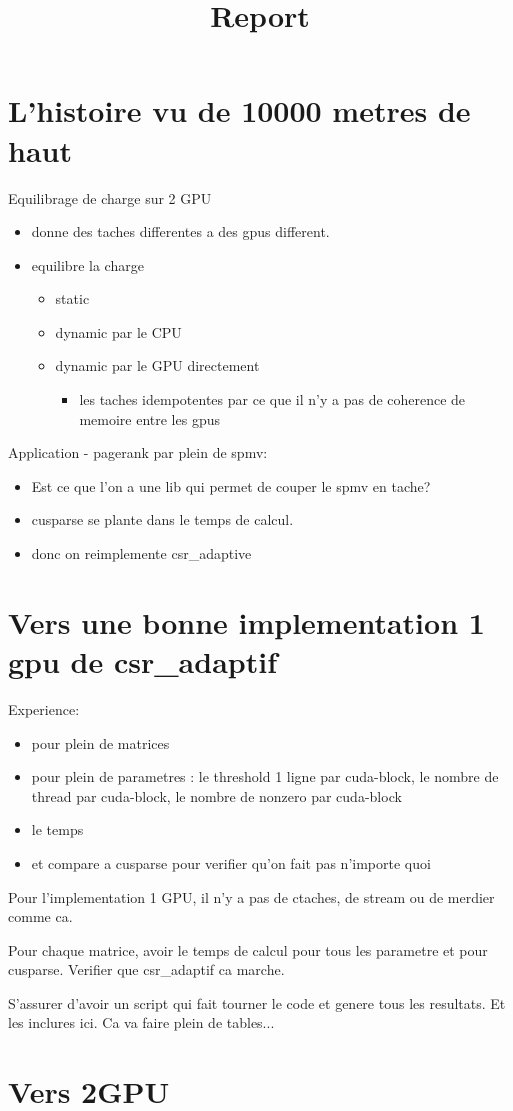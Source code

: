 \documentclass{article}
\title{Report}
\begin{document}
\maketitle

\section{L'histoire vu de 10000 metres de haut}

Equilibrage de charge sur 2 GPU
\begin{itemize}
\item donne des taches differentes a des gpus different.
\item equilibre la charge
  \begin{itemize}
  \item static
  \item dynamic par le CPU
  \item dynamic par le GPU directement
    \begin{itemize}
    \item les taches idempotentes par ce que il n'y a pas de coherence
      de memoire entre les gpus
    \end{itemize}
  \end{itemize}
\end{itemize}

Application - pagerank par plein de spmv:
\begin{itemize}
\item Est ce que l'on a une lib qui permet de couper le spmv en tache?
\item cusparse se plante dans le temps de calcul.
\item donc on reimplemente csr\_adaptive
\end{itemize}

\section{Vers une bonne implementation 1 gpu de csr\_adaptif}

Experience:
\begin{itemize}
\item pour plein de matrices
\item pour plein de parametres : le threshold 1 ligne par cuda-block,
  le nombre de thread par cuda-block, le nombre de nonzero par
  cuda-block
\item le temps
\item et compare a cusparse pour verifier qu'on fait pas n'importe quoi
\end{itemize}

Pour l'implementation 1 GPU, il n'y a pas de ctaches, de stream ou de
merdier comme ca.

Pour chaque matrice, avoir le temps de calcul pour tous les parametre
et pour cusparse. Verifier que csr\_adaptif ca marche. 

S'assurer d'avoir un script qui fait tourner le code et genere tous
les resultats. Et les inclures ici. Ca va faire plein de tables...

\section{Vers 2GPU}
\end{document}
